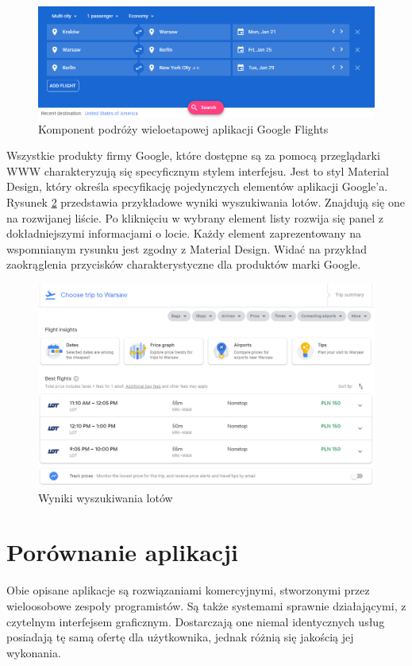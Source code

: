 \documentclass[12pt, twoside]{report}
\begin{document}
\begin{figure}[!ht]
\centering
\includegraphics[scale=0.60, keepaspectratio]{google_flights_multi.png}
\caption{Komponent podróży wieloetapowej aplikacji Google Flights}
\label{fig:google_flights_multi}
\end{figure}
Wszystkie produkty firmy Google, które dostępne są za pomocą przeglądarki WWW charakteryzują się specyficznym stylem interfejsu. Jest to styl Material Design, który określa specyfikację pojedynczych elementów aplikacji Google'a. Rysunek \ref{fig:google_flights_result} przedstawia przykładowe wyniki wyszukiwania lotów. Znajdują się one na rozwijanej liście. Po kliknięciu w wybrany element listy rozwija się panel z dokładniejszymi informacjami o locie. Każdy element zaprezentowany na wspomnianym rysunku jest zgodny z Material Design. Widać na przykład zaokrąglenia przycisków charakterystyczne dla produktów marki Google. 

\begin{figure}[!ht]
\centering
\includegraphics[scale=0.50, keepaspectratio]{google_flights_result.png}
\caption{Wyniki wyszukiwania lotów}
\label{fig:google_flights_result}
\end{figure}


\section{Porównanie aplikacji}
Obie opisane aplikacje są rozwiązaniami komercyjnymi, stworzonymi przez wieloosobowe zespoły programistów. Są także systemami sprawnie działającymi, z czytelnym interfejsem graficznym. Dostarczają one niemal identycznych usług {\dywiz} posiadają tę samą ofertę dla użytkownika, jednak różnią się jakością jej wykonania. 
\end{document}

